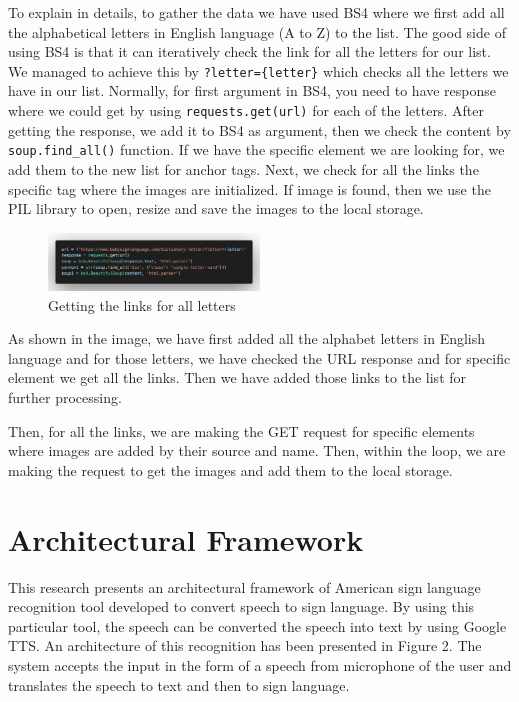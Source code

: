 \documentclass[twocolumn,10pt]{asme2ej}
\begin{document}
To explain in details, to gather the data we have used BS4 where we first add all the alphabetical letters in English language (A to Z) to the list. The good side of using BS4 is that it can iteratively check the link for all the letters for our list. We managed to achieve this by \verb|?letter={letter}| which checks all the letters we have in our list. Normally, for first argument in BS4, you need to have response where we could get by using \verb|requests.get(url)| for each of the letters. After getting the response, we add it to BS4 as argument, then we check the content by \verb|soup.find_all()| function. If we have the specific element we are looking for, we add them to the new list for anchor tags. Next, we check for all the links the specific tag where the images are initialized. If image is found, then we use the PIL library to open, resize and save the images to the local storage. 

\begin{figure}[h]
    \centering
    \includegraphics[width=0.5\textwidth]{figure/fig1.png}
    \caption{Getting the links for all letters}
    \label{fig:mesh1}
\end{figure}
As shown in the image, we have first added all the alphabet letters in English language and for those letters, we have checked the URL response and for specific element we get all the links. Then we have added those links to the list for further processing. 

Then, for all the links, we are making the GET request for specific elements where images are added by their source and name. Then, within the loop, we are making the request to get the images and add them to the local storage. 

\section{Architectural Framework}
This research presents an architectural framework of American sign language recognition tool developed to convert speech to sign language. By using this particular tool, the speech can be converted the speech into text by using Google TTS. An architecture of this recognition has been presented in Figure 2. The system accepts the input in the form of a speech from microphone of the user and translates the speech to text and then to sign language. 
\end{document}
